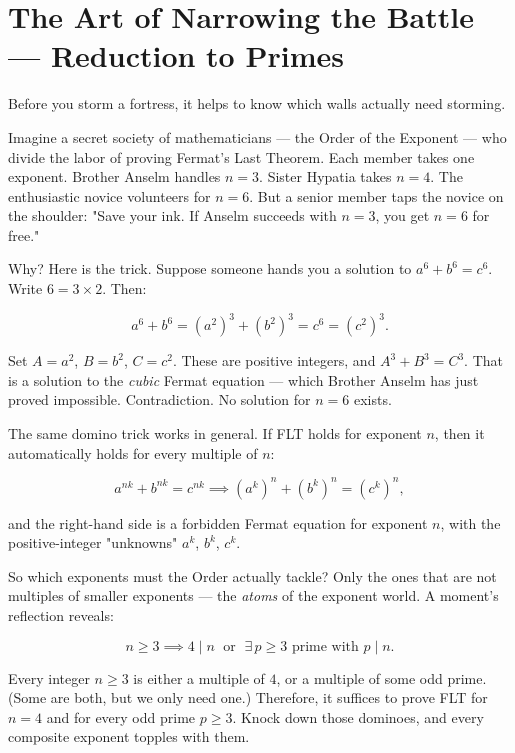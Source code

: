 \documentclass[11pt,openright,twoside]{book}
\theoremstyle{definition}
\begin{document}
\bigskip


\section{The Art of Narrowing the Battle — Reduction to Primes}

Before you storm a fortress, it helps to know which walls actually need storming.

Imagine a secret society of mathematicians --- the Order of the Exponent --- who divide the labor of proving Fermat's Last Theorem. Each member takes one exponent. Brother Anselm handles $n = 3$. Sister Hypatia takes $n = 4$. The enthusiastic novice volunteers for $n = 6$. But a senior member taps the novice on the shoulder: "Save your ink. If Anselm succeeds with $n = 3$, you get $n = 6$ for free."

Why? Here is the trick. Suppose someone hands you a solution to $a^6 + b^6 = c^6$. Write $6 = 3 \times 2$. Then:

\[a^6 + b^6 = (a^2)^3 + (b^2)^3 = c^6 = (c^2)^3.\]

Set $A = a^2$, $B = b^2$, $C = c^2$. These are positive integers, and $A^3 + B^3 = C^3$. That is a solution to the \textit{cubic} Fermat equation --- which Brother Anselm has just proved impossible. Contradiction. No solution for $n = 6$ exists.

The same domino trick works in general. If FLT holds for exponent $n$, then it automatically holds for every multiple of $n$:

\[a^{nk} + b^{nk} = c^{nk} \implies (a^k)^n + (b^k)^n = (c^k)^n,\]

and the right-hand side is a forbidden Fermat equation for exponent $n$, with the positive-integer "unknowns" $a^k$, $b^k$, $c^k$.

So which exponents must the Order actually tackle? Only the ones that are not multiples of smaller exponents --- the \textit{atoms} of the exponent world. A moment's reflection reveals:

\[n \ge 3 \implies 4 \mid n \;\text{ or }\; \exists\, p \ge 3 \text{ prime with } p \mid n.\]

Every integer $n \ge 3$ is either a multiple of $4$, or a multiple of some odd prime. (Some are both, but we only need one.) Therefore, it suffices to prove FLT for $n = 4$ and for every odd prime $p \ge 3$. Knock down those dominoes, and every composite exponent topples with them.
\end{document}
